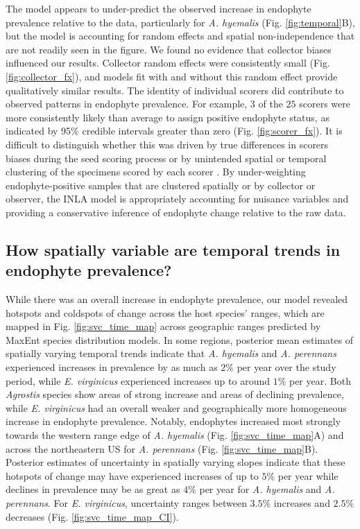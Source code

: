 \documentclass[11pt]{article}
\let\cite\citep
\begin{document}
The model appears to under-predict the observed increase in endophyte prevalence relative to the data, particularly for \emph{A. hyemalis} (Fig. \ref{fig:temporal}B), but the model is accounting for random effects and spatial non-independence that are not readily seen in the figure. 
We found no evidence that collector biases influenced our results. 
Collector random effects were consistently small (Fig. \ref{fig:collector_fx}), and models fit with and without this random effect provide qualitatively similar results.
The identity of individual scorers did contribute to observed patterns in endophyte prevalence.
For example, $3$ of the $25$ scorers were more consistently likely than average to assign positive endophyte status, as indicated by 95\% credible intervals greater than zero (Fig. \ref{fig:scorer_fx}). 
It is difficult to distinguish whether this was driven by true differences in scorers biases during the seed scoring process or by unintended spatial or temporal clustering of the specimens scored by each scorer \cite{clayton1993spatial,urdangarin2023evaluating}. 
By under-weighting endophyte-positive samples that are clustered spatially or by collector or observer, the INLA model is appropriately accounting for nuisance variables and providing a conservative inference of endophyte change relative to the raw data. 


\subsection*{How spatially variable are temporal trends in endophyte prevalence?}
While there was an overall increase in endophyte prevalence, our model revealed hotspots and coldspots of change across the host species' ranges, which are mapped in Fig. \ref{fig:svc_time_map} across geographic ranges predicted by MaxEnt species distribution models.
In some regions, posterior mean estimates of spatially varying temporal trends indicate that \emph{A. hyemalis} and \emph{A. perennans} experienced increases in prevalence by as much as $2$\% per year over the study period, while  \emph{E. virginicus} experienced increases up to around $1$\% per year. 
Both \emph{Agrostis} species show areas of strong increase and areas of declining prevalence, while \emph{E. virginicus} had an overall weaker and geographically more homogeneous increase in endophyte prevalence.
Notably, endophytes increased most strongly towards the western range edge of \emph{A. hyemalis} (Fig. \ref{fig:svc_time_map}A) and across the northeastern US for \emph{A. perennans} (Fig. \ref{fig:svc_time_map}B). 
Posterior estimates of uncertainty in spatially varying slopes indicate that these hotspots of change may have experienced increases of up to $5$\% per year while declines in prevalence may be as great as $4$\% per year for \emph{A. hyemalis} and \emph{A. perennans}.
For \emph{E. virginicus}, uncertainty ranges between $3.5$\% increases and $2.5$\% decreases (Fig. \ref{fig:svc_time_map_CI}).
\end{document}
